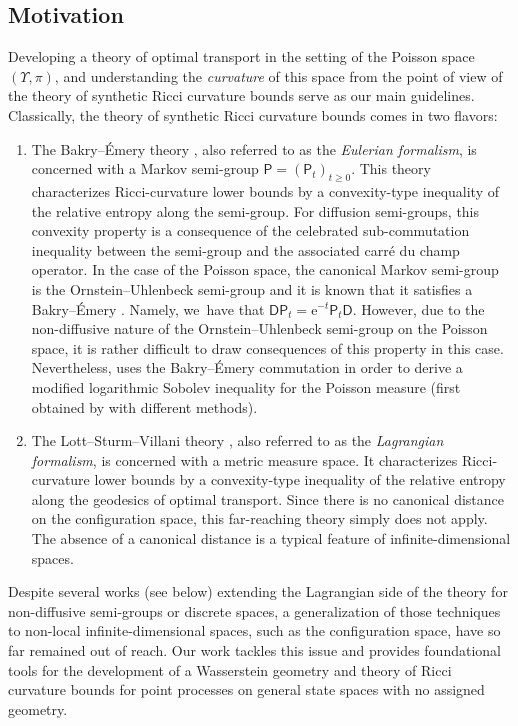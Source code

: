 \documentclass[10pt]{amsart}
\theoremstyle{definition}
\theoremstyle{remark}
\begin{document}
\subsection{Motivation}
Developing a theory of optimal transport in the setting of the Poisson space $(\varUpsilon, \pi)$, and understanding the \emph{curvature} of this space from the point of view of the theory of synthetic Ricci curvature bounds serve as our main guidelines.
Classically, the theory of synthetic Ricci curvature bounds comes in two flavors:
\begin{enumerate}[$(\rm i)$, wide]
\item The Bakry--Émery theory \cite{BakryEmery,BGL}, also referred to as the \emph{Eulerian formalism}, is concerned with a Markov semi-group $\mathsf{P} = (\mathsf{P}_{t})_{t \geq 0 }$.
This theory characterizes Ricci-curvature lower bounds by a convexity-type inequality of the relative entropy along the semi-group.
For diffusion semi-groups, this convexity property is a consequence of the celebrated sub-commutation inequality between the semi-group and the associated carré du champ operator.
In the case of the Poisson space, the canonical Markov semi-group is the Ornstein--Uhlenbeck semi-group and it is known that it satisfies a Bakry--Émery \cite[Lem.\,6]{LastAnaSto}.
Namely, we~have that $\mathsf{D} \mathsf{P}_{t} = \mathrm{e}^{-t} \mathsf{P}_{t} \mathsf{D}$.
However, due to the non-diffusive nature of the Ornstein--Uhlenbeck semi-group on the Poisson space, it is rather difficult to draw consequences of this property in this case.
Nevertheless, \cite{Chafai} uses the Bakry--Émery commutation in order to derive a modified logarithmic Sobolev inequality for the Poisson measure (first obtained by \cite{Wu} with different methods).

\item The Lott--Sturm--Villani theory \cite{Sturm,LottVillani,AGSDuke}, also referred to as the \emph{Lagrangian formalism}, is concerned with a metric measure space.
It characterizes Ricci-curvature lower bounds by a convexity-type inequality of the relative entropy along the geodesics of optimal transport.
Since there is no canonical distance on the configuration space, this far-reaching theory simply does not apply.
The absence of a canonical distance is a typical feature of infinite-dimensional spaces.
\end{enumerate}

Despite several works (see below) extending the Lagrangian side of the theory for non-diffusive semi-groups or discrete spaces, a generalization of those techniques to non-local infinite-dimensional spaces, such as the configuration space, have so far remained out of reach.
Our work tackles this issue and provides foundational tools for the development of a Wasserstein geometry and theory of Ricci curvature bounds for point processes on general state spaces with no assigned geometry.
\end{document}
